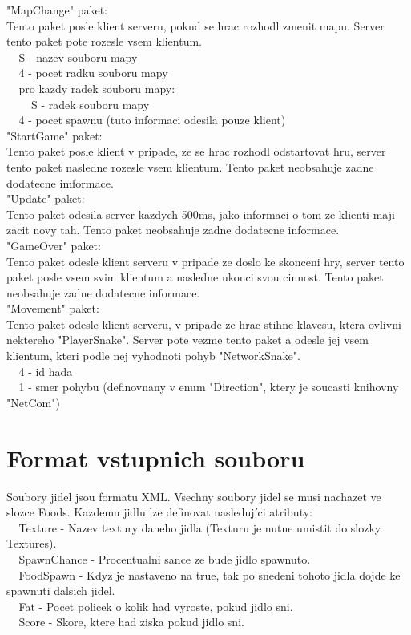 \documentclass{article}
\newcommand{\s}{$~~~~~$}
\begin{document}
\noindent "MapChange" paket:\\
Tento paket posle klient serveru, pokud se hrac rozhodl zmenit mapu. Server tento paket pote rozesle vsem klientum.\\
\s S - nazev souboru mapy\\
\s 4 - pocet radku souboru mapy\\
\s pro kazdy radek souboru mapy:\\
\s\s S - radek souboru mapy\\
\s 4 - pocet spawnu (tuto informaci odesila pouze klient)\\

\noindent "StartGame" paket:\\
Tento paket posle klient v pripade, ze se hrac rozhodl odstartovat hru, server tento paket nasledne rozesle vsem klientum. Tento paket neobsahuje zadne dodatecne imformace.\\

\noindent "Update" paket:\\
Tento paket odesila server kazdych 500ms, jako informaci o tom ze klienti maji zacit novy tah. Tento paket neobsahuje zadne dodatecne informace.\\

\noindent "GameOver" paket:\\
Tento paket odesle klient serveru v pripade ze doslo ke skonceni hry, server tento paket posle vsem svim klientum a nasledne ukonci svou cinnost. Tento paket neobsahuje zadne dodatecne informace.\\

\noindent "Movement" paket:\\
Tento paket odesle klient serveru, v pripade ze hrac stihne klavesu, ktera ovlivni nektereho "PlayerSnake". Server pote vezme tento paket a odesle jej vsem klientum, kteri podle nej vyhodnoti pohyb "NetworkSnake".\\
\s 4 - id hada\\
\s 1 - smer pohybu (definovnany v enum "Direction", ktery je soucasti knihovny "NetCom")\\

\section*{Format vstupnich souboru}
Soubory jidel jsou formatu XML. Vsechny soubory jidel se musi nachazet ve slozce Foods. Kazdemu jidlu lze definovat nasledujíci atributy:\\
\s Texture - Nazev textury daneho jidla (Texturu je nutne umistit do slozky Textures).\\
\s SpawnChance - Procentualni sance ze bude jidlo spawnuto.\\
\s FoodSpawn - Kdyz je nastaveno na true, tak po snedeni tohoto jidla dojde ke spawnuti dalsich jidel.\\
\s Fat - Pocet policek o kolik had vyroste, pokud jidlo sni.\\
\s Score - Skore, ktere had ziska pokud jidlo sni.\\
\end{document}
